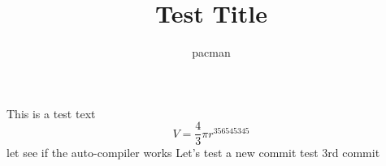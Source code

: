 \documentclass[a4paper]{report}
\title{Test Title}
\author{pacman}
\begin{document}
  This is a test text
  $$V=\frac{4}{3}\pi r^356545345$$
  let see if the auto-compiler works
  Let's test a new commit
  test 3rd commit
\end{document}

